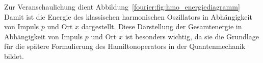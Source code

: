 

Zur Veranschaulichung dient Abbildung~\ref{fourier:fig:hmo_energiediagramm}
Damit ist die Energie des klassischen harmonischen Oszillators in Abhängigkeit von Impuls \( p \) und Ort \( x \) dargestellt.  
Diese Darstellung der Gesamtenergie in Abhängigkeit von Impuls \( p \) und Ort \( x \) ist besonders wichtig,  
da sie die Grundlage für die spätere Formulierung des Hamiltonoperators in der Quantenmechanik bildet.